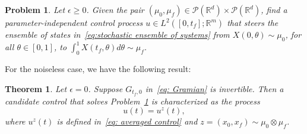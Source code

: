 \documentclass[12pt]{amsart}
\newtheorem{theorem}{Theorem}[section]
\newtheorem{problem}{Problem}[section]
\newcommand{\R}{\mathbb{R}}
\renewcommand{\(}{\left (}
\renewcommand{\)}{\right )}
\numberwithin{equation}{section}
\begin{document}

\begin{problem}\label{problem: general stochastic}
Let $\epsilon\geq 0$. Given the pair $(\mu_0,\mu_f)\in\mathcal{P}(\R^d)\times\mathcal{P}(\R^d)$, find a parameter-independent control process $u\in L^2([0,t_f];\mathbb{R}^m)$ that steers the ensemble of states in~\eqref{eq:stochastic ensemble of systems} from $X(0,\theta)\sim\mu_0$, for all $\theta\in[0,1]$, to $\int_0^1X(t_f,\theta)d\theta\sim\mu_f$. %
\end{problem}

For the noiseless case, we have the following result:
\begin{theorem}\label{thm: deterministic control}
Let $\epsilon=0$.  Suppose $G_{t_f,0}$ in~\eqref{eq: Gramian} is invertible. Then a candidate control that solves Problem~\ref{problem: general stochastic} is characterized as the process
\begin{equation}\label{eq: proposed noiseless control process}
u(t)=u^z(t),    
\end{equation}
where $u^z(t)$ is defined in~\eqref{eq: averaged control} and $z=(x_0,x_f)\sim\mu_0\otimes\mu_f$.
\end{theorem}
\end{document}
